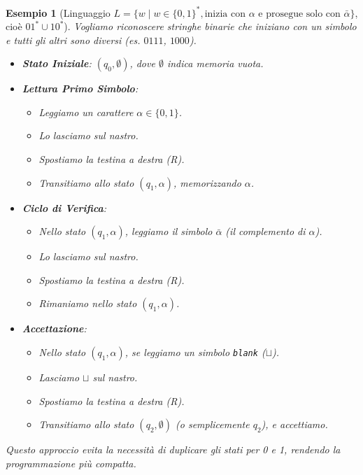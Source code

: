 \documentclass[a4paper, 11pt]{book} %
\newtheorem{example}[theorem]{Esempio}
\theoremstyle{definition}
\begin{document}
\begin{example}[Linguaggio $L = \{w \mid w \in \{0,1\}^*, \text{inizia con } \alpha \text{ e prosegue solo con } \bar{\alpha} \}$, cioè $01^* \cup 10^*$]
Vogliamo riconoscere stringhe binarie che iniziano con un simbolo e tutti gli altri sono diversi (es. $0111$, $1000$).
\begin{itemize}
    \item \textbf{Stato Iniziale}: $(q_0, \emptyset)$, dove $\emptyset$ indica memoria vuota.
    \item \textbf{Lettura Primo Simbolo}:
        \begin{itemize}
            \item Leggiamo un carattere $\alpha \in \{0,1\}$.
            \item Lo lasciamo sul nastro.
            \item Spostiamo la testina a destra (R).
            \item Transitiamo allo stato $(q_1, \alpha)$, memorizzando $\alpha$.
        \end{itemize}
    \item \textbf{Ciclo di Verifica}:
        \begin{itemize}
            \item Nello stato $(q_1, \alpha)$, leggiamo il simbolo $\bar{\alpha}$ (il complemento di $\alpha$).
            \item Lo lasciamo sul nastro.
            \item Spostiamo la testina a destra (R).
            \item Rimaniamo nello stato $(q_1, \alpha)$.
        \end{itemize}
    \item \textbf{Accettazione}:
        \begin{itemize}
            \item Nello stato $(q_1, \alpha)$, se leggiamo un simbolo \texttt{blank} ($\sqcup$).
            \item Lasciamo $\sqcup$ sul nastro.
            \item Spostiamo la testina a destra (R).
            \item Transitiamo allo stato $(q_2, \emptyset)$ (o semplicemente $q_2$), e accettiamo.
        \end{itemize}
\end{itemize}
Questo approccio evita la necessità di duplicare gli stati per 0 e 1, rendendo la programmazione più compatta.
\end{example}
\end{document}
